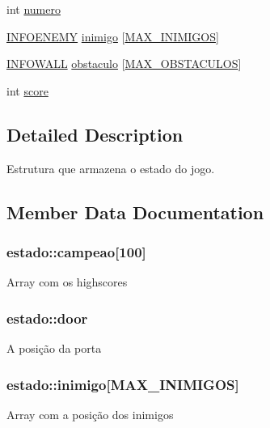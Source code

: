 \begin{DoxyCompactItemize}
int \hyperlink{structestado_a89701bb4e389f671e0426814ac00347d}{numero}
\item 
\hyperlink{estado_8h_a669afeb8186d15d875a4acfaf45777b3}{I\+N\+F\+O\+E\+N\+E\+MY} \hyperlink{structestado_a167d1a72e13b3a1b1bcf3867d75014d9}{inimigo} \mbox{[}\hyperlink{estado_8h_aa97e6cbfdd94711688f1176cb8dd916a}{M\+A\+X\+\_\+\+I\+N\+I\+M\+I\+G\+OS}\mbox{]}
\item 
\hyperlink{estado_8h_a1dba7cf209fb6716cca8713b979baaeb}{I\+N\+F\+O\+W\+A\+LL} \hyperlink{structestado_aca60907ddbf62ab205cdb578708b74e1}{obstaculo} \mbox{[}\hyperlink{estado_8h_ac574e2817856ecc9a890d2d47cb9d783}{M\+A\+X\+\_\+\+O\+B\+S\+T\+A\+C\+U\+L\+OS}\mbox{]}
\item 
int \hyperlink{structestado_a47e99ef4241dfe72d9d68244a68adb46}{score}
\end{DoxyCompactItemize}


\subsection{Detailed Description}
Estrutura que armazena o estado do jogo. 

\subsection{Member Data Documentation}
\subsubsection[{\texorpdfstring{campeao}{campeao}}]{ estado\+::campeao\mbox{[}100\mbox{]}}\hypertarget{structestado_a3421256c459875e123fd25ea089d3e6e}{}\label{structestado_a3421256c459875e123fd25ea089d3e6e}
Array com os highscores 
\subsubsection[{\texorpdfstring{door}{door}}]{ estado\+::door}\hypertarget{structestado_a7415ebf0dc1fbc535407bb2bd669dc81}{}\label{structestado_a7415ebf0dc1fbc535407bb2bd669dc81}
A posição da porta 
\subsubsection[{\texorpdfstring{inimigo}{inimigo}}]{ estado\+::inimigo\mbox{[}{\bf M\+A\+X\+\_\+\+I\+N\+I\+M\+I\+G\+OS}\mbox{]}}\hypertarget{structestado_a167d1a72e13b3a1b1bcf3867d75014d9}{}\label{structestado_a167d1a72e13b3a1b1bcf3867d75014d9}
Array com a posição dos inimigos 
